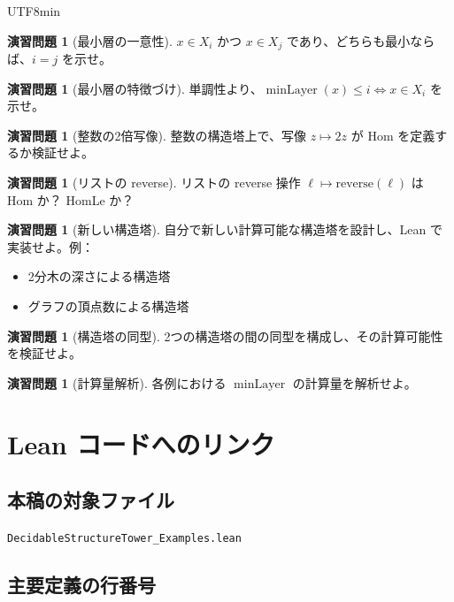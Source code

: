 \documentclass[12pt,a4paper]{article}
\theoremstyle{definition}
\newtheorem{exercise}[theorem]{演習問題}
\theoremstyle{remark}
\DeclareMathOperator{\minLayer}{minLayer}
\begin{document}
\begin{CJK}{UTF8}{min}
\begin{exercise}[最小層の一意性]
$x \in X_i$ かつ $x \in X_j$ であり、どちらも最小ならば、$i = j$ を示せ。
\end{exercise}

\begin{exercise}[最小層の特徴づけ]
単調性より、$\minLayer(x) \leq i \Leftrightarrow x \in X_i$ を示せ。
\end{exercise}

\begin{exercise}[整数の2倍写像]
整数の構造塔上で、写像 $z \mapsto 2z$ が Hom を定義するか検証せよ。
\end{exercise}

\begin{exercise}[リストの reverse]
リストの reverse 操作 $\ell \mapsto \text{reverse}(\ell)$ は Hom か？ HomLe か？
\end{exercise}

\begin{exercise}[新しい構造塔]
自分で新しい計算可能な構造塔を設計し、Lean で実装せよ。例：
\begin{itemize}
\item 2分木の深さによる構造塔
\item グラフの頂点数による構造塔
\end{itemize}
\end{exercise}

\begin{exercise}[構造塔の同型]
2つの構造塔の間の同型を構成し、その計算可能性を検証せよ。
\end{exercise}

\begin{exercise}[計算量解析]
各例における $\minLayer$ の計算量を解析せよ。
\end{exercise}

\appendix

\section{Lean コードへのリンク}

\subsection{本稿の対象ファイル}

\texttt{DecidableStructureTower\_Examples.lean}

\subsection{主要定義の行番号}


\end{CJK}
\end{document}
